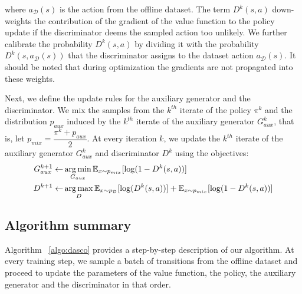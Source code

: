 where $ a_{\mathcal{D}}(s) $ is the action from the offline dataset. 
The term $ D^k(s,a) $ down-weights the contribution of the gradient of the value function to the policy update if the discriminator deems the sampled action too unlikely. We further calibrate the probability $ D^k(s,a) $ by dividing it with the probability $ D^k(s,a_{\mathcal{D}}(s)) $ that the discriminator assigns to the dataset action $a_{\mathcal{D}}(s) $. It should be noted that during optimization the gradients are not propagated into these weights.%

Next, we define the update rules for the auxiliary generator and the discriminator. We mix the samples from the $k^{th}$ iterate of the policy $\pi^k$ and the distribution $p_{aux}$ induced by the $k^{th}$ iterate of the auxiliary generator $G^k_{aux}$, that is, let $p_{mix} = \dfrac{ \pi^k + p_{aux} }{ 2 }$. At every iteration $k$, we update the $k^{th}$ iterate of the auxiliary generator $ G^{k}_{aux} $ and discriminator $D^k$ using the objectives:
\begin{align}
    G^{k+1}_{aux} \leftarrow& \operatorname*{arg\,min}_{ G_{aux} } \mathbb{E}_{ x \sim p_{mix} } [ \log(1-D^k(s,a))] \label{eq:dasco_gaux}\\ 
    D^{k+1}  \leftarrow& \operatorname*{arg\,max}_{D}  \mathbb{E}_{ x \sim p_{\mathcal{D}} } [\log(D^k(s,a))] + \mathbb{E}_{ x \sim p_{mix} } [ \log(1-D^k(s,a))]\label{eq:dasco_d}
\end{align}
\subsection{Algorithm summary}
\label{sec:algo_summary}

Algorithm ~\ref{algo:dasco} provides a step-by-step description of our algorithm. At every training step, we sample a batch of transitions from the offline dataset and proceed to update the parameters of the value function, the policy, the auxiliary generator and the discriminator in that order.

